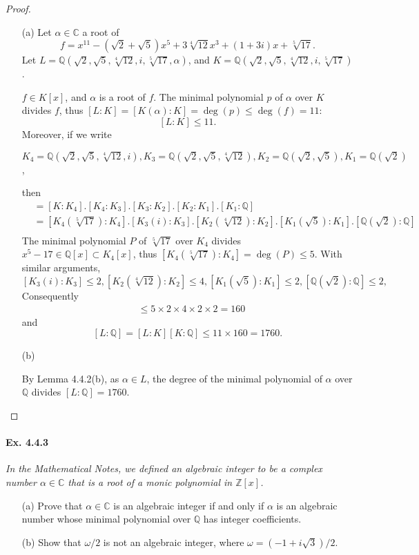 \documentclass[11pt,a4paper]{article}
\newcommand{\Q}{\mathbb{Q}}
\newcommand{\Z}{\mathbb{Z}}
\newcommand{\C}{\mathbb{C}}
\begin{document}
\begin{proof}
\begin{enumerate}
\item[(a)]
Let $\alpha \in \C$ a root of 
$$f = x^{11}-(\sqrt{2}+\sqrt{5}) x^5+3\sqrt[4]{12}x^3+(1+3i) x +\sqrt[5]{17}.$$
Let $L = \Q(\sqrt{2},\sqrt{5},\sqrt[4]{12},i,\sqrt[5]{17},\alpha)$, and $K = \Q(\sqrt{2},\sqrt{5},\sqrt[4]{12},i,\sqrt[5]{17})$.

$f \in K[x]$, and $\alpha$ is a root of $f$. The minimal polynomial $p$ of $\alpha$ over $K$ divides $f$, thus  $[L : K] = [K(\alpha) : K] =\deg(p) \leq \deg(f)=11$:
$$[L : K]\leq 11.$$
Moreover, if we write 

$K_4  =  \Q(\sqrt{2},\sqrt{5},\sqrt[4]{12},i), K_3 =  \Q(\sqrt{2},\sqrt{5},\sqrt[4]{12}),K_2 =  \Q(\sqrt{2},\sqrt{5}), K_1 = \Q(\sqrt{2})$,

then
\begin{align*}
[K : \Q] &= [K : K_4] .[K_4:K_3] .[K_3:K_2] .[K_2:K_1] .[K_1:\Q]\\
&  = [K_4( \sqrt[5]{17}): K_4]. [K_3(i):K_3]. [K_2(\sqrt[4]{12}):K_2] .[K_1(\sqrt{5}):K_1]. [\Q(\sqrt{2}):\Q]\\
\end{align*}
 The minimal polynomial $P$ of $ \sqrt[5]{17}$ over $K_4$ divides $x^5-17 \in \Q[x] \subset K_4[x]$, thus $[K_4(\sqrt[5]{17}) : K_4] = \deg(P) \leq 5$. With similar arguments, 
 $$[K_3(i):K_3] \leq 2, [K_2(\sqrt[4]{12}):K_2] \leq 4, [K_1(\sqrt{5}):K_1] \leq 2,[\Q(\sqrt{2}):\Q] \leq 2,$$
Consequently
\begin{align*}
[K : \Q] &\leq 5\times 2 \times 4 \times 2 \times 2 = 160
\end{align*}
and
 $$[L : \Q] = [L:K][K:\Q] \leq 11 \times 160 = 1760.$$

\item[(b)]

By Lemma 4.4.2(b),  as $\alpha \in L$, the degree of the minimal polynomial of  $\alpha$ over $\Q$ divides ${[L:\Q] = 1760}$.
\end{enumerate}
\end{proof}

\paragraph{Ex. 4.4.3}

{\it In the Mathematical Notes, we defined an algebraic integer to be a complex number $\alpha \in \C$ that is a root of a monic polynomial in $\Z[x]$.
\begin{enumerate}
\item[(a)] Prove that $\alpha \in \C$ is an algebraic integer if and only if $\alpha$ is an algebraic number whose minimal polynomial over $\Q$ has integer coefficients.
\item[(b)] Show that $\omega/2$ is not an algebraic integer, where $\omega = (-1+i\sqrt{3})/2$.
\end{enumerate}
}
\end{document}
